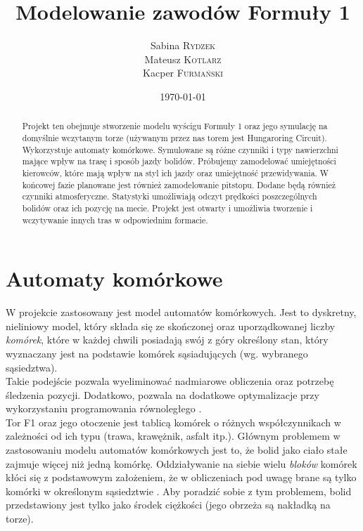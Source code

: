 \documentclass[12p]{extarticle}
\title{Modelowanie zawodów Formuły 1} %
\author{Sabina \textsc{Rydzek} \\ Mateusz \textsc{Kotlarz} \\ Kacper \textsc{Furmański}} %
\date{\today} %
\begin{document}
\maketitle %


\begin{abstract}
Projekt ten obejmuje stworzenie modelu wyścigu Formuły 1 oraz jego symulację na domyślnie wczytanym torze (używanym przez nas torem jest Hungaroring Circuit). Wykorzystuje automaty komórkowe. Symulowane są różne czynniki i typy nawierzchni mające wpływ na trasę i sposób jazdy bolidów. Próbujemy zamodelować umiejętności kierowców, które mają wpływ na styl ich jazdy oraz umiejętność przewidywania. W końcowej fazie planowane jest również zamodelowanie pitstopu. Dodane będą również czynniki atmosferyczne. Statystyki umożliwiają odczyt prędkości poszczególnych bolidów oraz ich pozycję na mecie. Projekt jest otwarty i umożliwia tworzenie i wczytywanie innych tras w odpowiednim formacie.
\end{abstract}

\pagebreak


\section{Automaty komórkowe}

W projekcie zastosowany jest model automatów komórkowych. Jest to dyskretny, nieliniowy model, który składa się ze skończonej oraz uporządkowanej liczby \textit{komórek}, które w każdej chwili posiadają swój z góry określony stan, który wyznaczany jest na podstawie komórek sąsiadujących (wg. wybranego sąsiedztwa). \\

Takie podejście pozwala wyeliminować nadmiarowe obliczenia oraz potrzebę śledzenia pozycji. Dodatkowo, pozwala na dodatkowe optymalizacje przy wykorzystaniu programowania równoległego \cite{cellularAutomata}. \\

Tor F1 oraz jego otoczenie jest tablicą komórek o różnych współczynnikach w zależności od ich typu (trawa, krawężnik, asfalt itp.). Głównym problemem w zastosowaniu modelu automatów komórkowych jest to, że bolid jako ciało stałe zajmuje więcej niż jedną komórkę. Oddziaływanie na siebie wielu \textit{bloków} komórek kłóci się z podstawowym założeniem, że w obliczeniach pod uwagę brane są tylko komórki w określonym sąsiedztwie \cite{particleSimulation}. Aby poradzić sobie z tym problemem, bolid przedstawiony jest tylko jako środek ciężkości (jego obrzeża są nakładką na torze). 
\end{document}
